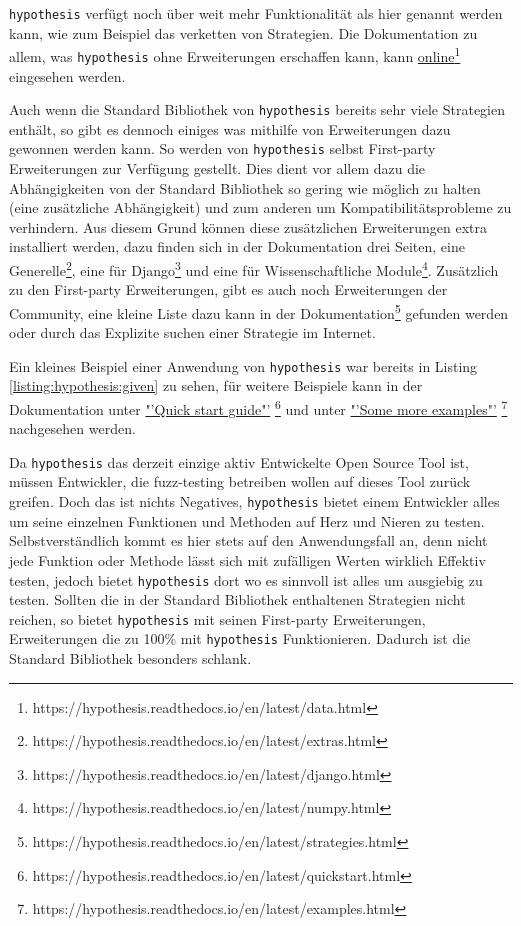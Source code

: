 \lstinline{hypothesis} verfügt noch über weit mehr Funktionalität als hier genannt werden kann,
wie zum Beispiel das verketten von Strategien. Die Dokumentation zu allem, was
\lstinline{hypothesis} ohne Erweiterungen erschaffen kann, kann
\href{https://hypothesis.readthedocs.io/en/latest/data.html}{online}\footnote{https://hypothesis.readthedocs.io/en/latest/data.html}
eingesehen werden.

Auch wenn die Standard Bibliothek von \lstinline{hypothesis} bereits sehr viele Strategien enthält,
so gibt es dennoch einiges was mithilfe von Erweiterungen dazu gewonnen werden kann. So werden
von \lstinline{hypothesis} selbst First-party Erweiterungen zur Verfügung gestellt. Dies dient
vor allem dazu die Abhängigkeiten von der Standard Bibliothek so gering wie möglich zu halten
(eine zusätzliche Abhängigkeit) und zum anderen um Kompatibilitätsprobleme zu verhindern. Aus
diesem Grund können diese zusätzlichen Erweiterungen extra installiert werden, dazu finden sich
in der Dokumentation drei Seiten, eine Generelle\footnote{https://hypothesis.readthedocs.io/en/latest/extras.html},
eine für Django\footnote{https://hypothesis.readthedocs.io/en/latest/django.html} und eine für
Wissenschaftliche Module\footnote{https://hypothesis.readthedocs.io/en/latest/numpy.html}.
Zusätzlich zu den First-party Erweiterungen, gibt es auch noch Erweiterungen der Community,
eine kleine Liste dazu kann in der Dokumentation\footnote{https://hypothesis.readthedocs.io/en/latest/strategies.html}
gefunden werden oder durch das Explizite suchen einer Strategie im Internet.

Ein kleines Beispiel einer Anwendung von \lstinline{hypothesis} war bereits in Listing
\ref{listing:hypothesis:given} zu sehen, für weitere Beispiele kann in der Dokumentation unter
\href{https://hypothesis.readthedocs.io/en/latest/quickstart.html}{"'Quick start guide"'}
\footnote{https://hypothesis.readthedocs.io/en/latest/quickstart.html} und unter
\href{https://hypothesis.readthedocs.io/en/latest/examples.html}{"'Some more examples"'}
\footnote{https://hypothesis.readthedocs.io/en/latest/examples.html} nachgesehen werden.

Da \lstinline{hypothesis} das derzeit einzige aktiv Entwickelte Open Source Tool ist, müssen
Entwickler, die \gls{fuzz}-testing betreiben wollen auf dieses Tool zurück greifen. Doch das
ist nichts Negatives, \lstinline{hypothesis} bietet einem Entwickler alles um seine einzelnen
Funktionen und Methoden auf Herz und Nieren zu testen. Selbstverständlich kommt es hier stets
auf den Anwendungsfall an, denn nicht jede Funktion oder Methode lässt sich mit zufälligen Werten
wirklich Effektiv testen, jedoch bietet \lstinline{hypothesis} dort wo es sinnvoll ist alles
um ausgiebig zu testen. Sollten die in der Standard Bibliothek enthaltenen Strategien nicht
reichen, so bietet \lstinline{hypothesis} mit seinen First-party Erweiterungen, Erweiterungen die
zu 100\% mit \lstinline{hypothesis} Funktionieren. Dadurch ist die Standard Bibliothek besonders
schlank.

